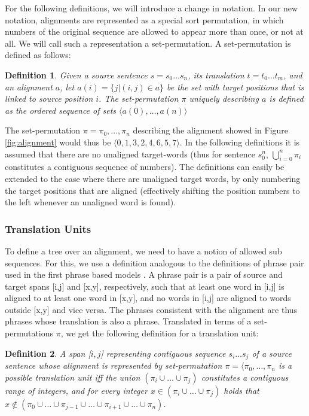 \documentclass{report}
\theoremstyle{definition}
\theoremstyle{plain}
\newtheorem{definition}{Definition}
\begin{document}
For the following definitions, we will introduce a change in notation. In our new notation, alignments are represented as a special sort permutation, in which numbers of the original sequence are allowed to appear more than once, or not at all. We will call such a representation a set-permutation. A set-permutation is defined as follows:

\begin{definition}
Given a source sentence $s = s_0 \ldots s_n$, its translation $t = t_0 \ldots t_m$, and an alignment $a$, let $a(i) = \{j | (i,j)\in a\}$ be the set with target positions that is linked to source position $i$. The set-permutation $\pi$ uniquely describing $a$ is defined as the ordered sequence of sets
$\langle a(0), \ldots, a(n) \rangle$
\end{definition}

The set-permutation $\pi = \pi_0, ..., \pi_n$ describing the alignment showed in Figure \ref{fig:alignment} would thus be $\langle {0}, {1}, {3}, {2,4}, {6}, {5}, {7}\rangle$. In the following definitions it is assumed that there are no unaligned target-words (thus for sentence $s_0^n$, $\bigcup_{i=0}^n \pi_i$ constitutes a contiguous sequence of numbers). The definitions can easily be extended to the case where there are unaligned target words, by only numbering the target positions that are aligned (effectively shifting the position numbers to the left whenever an unaligned word is found).

\subsubsection{Translation Units} To define a tree over an alignment, we need to have a notion of allowed sub sequences. For this, we use a definition analogous to the definitions of phrase pair used in the first phrase based models \citep{och2004alignment}. A phrase pair is a pair of source and target spans [i,j] and [x,y], respectively, such that at least one word in [i,j] is aligned to at least one word in [x,y], and no words in [i,j] are aligned to words outside [x,y] and vice versa. The phrases consistent with the alignment are thus phrases whose translation is also a phrase. Translated in terms of a set-permutations $\pi$, we get the following definition for a translation unit:

\begin{definition}
A span [$i,j$] representing contiguous sequence $s_i\ldots s_j$ of a source sentence whose alignment is represented by set-permutation $\pi = \langle\pi_0 ,\ldots ,\pi_n$ is a possible translation unit iff the union $(\pi_i\cup \ldots \cup \pi_j)$ constitutes a contiguous range of integers, and for every integer $x \in (\pi_i\cup \ldots \cup\pi_j)$ holds that  $x \notin (\pi_0\cup \ldots \cup \pi_{j-1} \cup \ldots\cup\pi_{i+1}\cup\ldots\cup \pi_n)$.
\end{definition}
\end{document}
